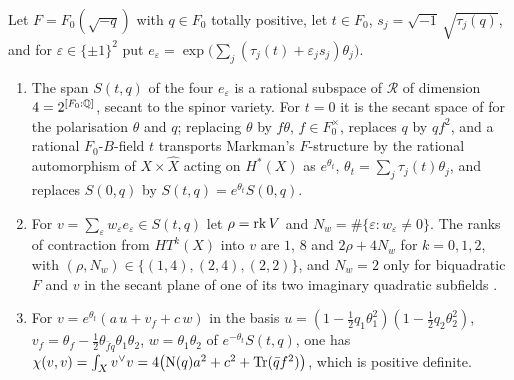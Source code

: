 \begin{proposition}\label{prop:quarticsecant}
Let $F=F_{0}(\sqrt{-q})$ with $q\in F_{0}$ totally positive, let $t\in F_{0}$,
$s_{j}=\sqrt{-1}\,\sqrt{\tau_{j}(q)}$, and for $\varepsilon\in\{\pm1\}^{2}$ put
$e_{\varepsilon}=\exp\bigl(\sum_{j}(\tau_{j}(t)+\varepsilon_{j}s_{j})\theta_{j}\bigr)$.
\begin{enumerate}[label=\textup{(\roman*)},leftmargin=2.6em,itemsep=2pt]
\item The span $S(t,q)$ of the four $e_{\varepsilon}$ is a rational subspace of
  $\mathcal{R}$ of dimension $4=2^{[F_{0}:\mathbb{Q}]}$, secant to the spinor variety.
  For $t=0$ it is the secant space of \cite[\S11.1, (11.1.2)]{Mar25c} for the
  polarisation $\theta$ and $q$; replacing $\theta$ by $f\theta$,
  $f\in F_{0}^{\times}$, replaces $q$ by $qf^{2}$, and a rational $F_{0}$-$B$-field
  $t$ transports Markman's $F$-structure by the rational automorphism of
  $X\times\widehat X$ acting on $H^{*}(X)$ as $e^{\theta_{t}}$,
  $\theta_{t}=\sum_{j}\tau_{j}(t)\theta_{j}$, and replaces $S(0,q)$ by
  $S(t,q)=e^{\theta_{t}}S(0,q)$.
\item For $v=\sum_{\varepsilon}w_{\varepsilon}e_{\varepsilon}\in S(t,q)$ let
  $\rho=\operatorname{rk} V$ and $N_{w}=\#\{\varepsilon:w_{\varepsilon}\ne0\}$. The ranks of
  contraction from $HT^{k}(X)$ into $v$ are $1$, $8$ and $2\rho+4N_{w}$ for
  $k=0,1,2$, with $(\rho,N_{w})\in\{(1,4),(2,4),(2,2)\}$, and $N_{w}=2$ only for
  biquadratic $F$ and $v$ in the secant plane of one of its two imaginary
  quadratic subfields \cite[\S11.2.1]{Mar25c}.
\item For $v=e^{\theta_{t}}(a\,u+v_{f}+c\,w)$ in the basis
  $u=(1-\tfrac12q_{1}\theta_{1}^{2})(1-\tfrac12q_{2}\theta_{2}^{2})$,
  $v_{f}=\theta_{f}-\tfrac12\theta_{\bar fq}\theta_{1}\theta_{2}$,
  $w=\theta_{1}\theta_{2}$ of $e^{-\theta_{t}}S(t,q)$, one has
  $\chi(v,v)=\int_{X}v^{\vee}v=4\bigl(\mathrm{N}(q)a^{2}+c^{2}+\operatorname{Tr}(\bar q f^{2})\bigr)$,
  which is positive definite.
\end{enumerate}
\end{proposition}

